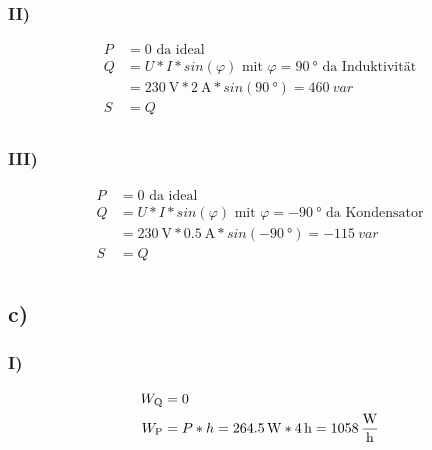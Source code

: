 \documentclass[../../document.tex]{subfiles}
\begin{document}
\subsubsection*{II)}

\begin{equation*}
    \begin{split}
        P &= 0\textrm{ da ideal}\\
        Q &= U * I * sin(\varphi) \textrm{ mit } \varphi = \SI{90}{\degree}\textrm{ da Induktivität}\\
        &= \SI{230}{\volt} * \SI{2}{\ampere} * sin(\SI{90}{\degree}) = \SI{460}{var}\\
        S &= Q\\
    \end{split}
\end{equation*}

\subsubsection*{III)}

\begin{equation*}
    \begin{split}
        P &= 0\textrm{ da ideal}\\
        Q &= U * I * sin(\varphi) \textrm{ mit } \varphi = \SI{-90}{\degree}\textrm{ da Kondensator}\\
        &= \SI{230}{\volt} * \SI{0,5}{\ampere} * sin(\SI{-90}{\degree}) = \SI{-115}{var}\\
        S &= Q\\
    \end{split}
\end{equation*}

\subsection*{c)}

\subsubsection*{I)}

\begin{equation*}
    \begin{split}
        W_{\textrm{Q}} &= 0\\
        W_{\textrm{P}} &= P * h = \SI{264,5}{\watt} * \SI{4}{\hour} = \SI{1058}{\frac{\watt}{\hour}}\\
    \end{split}
\end{equation*}
\end{document}
